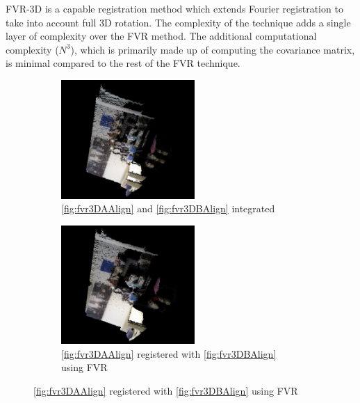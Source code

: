 FVR-3D is a capable registration method which extends Fourier registration to take into account full 3D rotation. The complexity of the technique adds a single layer of complexity over the FVR method. The additional computational complexity ($N^3$), which is primarily made up of computing the covariance matrix, is minimal compared to the rest of the FVR technique. \\


\begin{figure}[!htb] 
        \centering
        
		\begin{subfigure}[b]{3.0in}
				       \centering
                \includegraphics[width=2.0in]{images/methodology/FVR/fvr3d/PCAFrameAB}
                \caption{\ref{fig:fvr3DAAlign} and \ref{fig:fvr3DBAlign} integrated}
                \label{fig:fvr3DPCAAB}
        \end{subfigure}%
        \begin{subfigure}[b]{3.0in}
               \centering
                \includegraphics[width=2.0in]{images/methodology/FVR/fvr3d/FVRPCAFrameAB}
                \caption{\ref{fig:fvr3DAAlign} registered with \ref{fig:fvr3DBAlign} using FVR}
                \label{fig:fvr3DFVRPCAAB}
        \end{subfigure}        
        

\end{figure}
